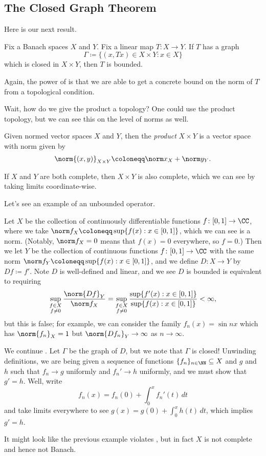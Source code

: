 \documentclass[../notes.tex]{subfiles}
\begin{document}
\subsection{The Closed Graph Theorem}
Here is our next result.
\begin{theorem} \label{thm:closed-graph}
	Fix a Banach spaces $X$ and $Y$. Fix a linear map $T\colon X\to Y$. If $T$ has a graph
	\[\Gamma\coloneqq\{(x,Tx)\in X\times Y:x\in X\}\]
	which is closed in $X\times Y$, then $T$ is bounded.
\end{theorem}
\begin{remark}
	Again, the power of  is that we are able to get a concrete bound on the norm of $T$ from a topological condition.
\end{remark}
Wait, how do we give the product a topology? One could use the product topology, but we can see this on the level of norms as well.
\begin{definition}[product]
	Given normed vector spaces $X$ and $Y$, then the \textit{product} $X\times Y$ is a vector space with norm given by
	\[\norm{(x,y)}_{X\times Y}\coloneqq\norm x_X+\norm y_Y.\]
\end{definition}
\begin{remark}
	If $X$ and $Y$ are both complete, then $X\times Y$ is also complete, which we can see by taking limits coordinate-wise.
\end{remark}
Let's see an example of an unbounded operator.
\begin{example} \label{ex:deriv-unbounded}
	Let $X$ be the collection of continuously differentiable functions $f\colon[0,1]\to\CC$, where we take $\norm f_X\coloneqq\sup\{f(x):x\in[0,1]\}$, which we can see is a norm. (Notably, $\norm f_X=0$ means that $f(x)=0$ everywhere, so $f=0$.) Then we let $Y$ be the collection of continuous functions $f\colon[0,1]\to\CC$ with the same norm $\norm f_Y\coloneqq\sup\{f(x):x\in[0,1]\}$, and we define $D\colon X\to Y$ by $Df\coloneqq f'$. Note $D$ is well-defined and linear, and we see $D$ is bounded is equivalent to requiring
	\[\sup_{\substack{f\in X\\f\ne0}}\frac{\norm{Df}_Y}{\norm f_X}=\sup_{\substack{f\in X\\f\ne0}}\frac{\sup\{f'(x):x\in[0,1]\}}{\sup\{f(x):x\in[0,1]\}}<\infty,\]
	but this is false; for example, we can consider the family $f_n(x)=\sin nx$ which has $\norm{f_n}_X=1$ but $\norm{Df_n}_Y\to\infty$ as $n\to\infty$.
\end{example}
\begin{example}
	We continue . Let $\Gamma$ be the graph of $D$, but we note that $\Gamma$ is closed! Unwinding definitions, we are being given a sequence of functions $\{f_n\}_{n\in\NN}\subseteq X$ and $g$ and $h$ such that $f_n\to g$ uniformly and $f_n'\to h$ uniformly, and we must show that $g'=h$. Well, write
	\[f_n(x)=f_n(0)+\int_0^xf_n'(t)\,dt\]
	and take limits everywhere to see $g(x)=g(0)+\int_0^xh(t)\,dt$, which implies $g'=h$.
\end{example}
It might look like the previous example violates , but in fact $X$ is not complete and hence not Banach.
\end{document}
